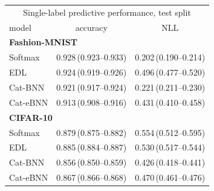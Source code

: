 \begin{tabular}{lcc}
\toprule
\multicolumn{3}{c}{Single-label predictive performance, test split} \\
model & accuracy & NLL \\
\midrule
\multicolumn{3}{l}{\textbf{Fashion-MNIST}} \\
\midrule
Softmax & 0.928\,(0.923--0.933) & 0.202\,(0.190--0.214) \\
EDL & 0.924\,(0.919--0.926) & 0.496\,(0.477--0.520) \\
Cat-BNN & 0.921\,(0.917--0.924) & 0.221\,(0.211--0.230) \\
Cat-eBNN & 0.913\,(0.908--0.916) & 0.431\,(0.410--0.458) \\
\midrule
\multicolumn{3}{l}{\textbf{CIFAR-10}} \\
\midrule
Softmax & 0.879\,(0.875--0.882) & 0.554\,(0.512--0.595) \\
EDL & 0.885\,(0.884--0.887) & 0.530\,(0.517--0.544) \\
Cat-BNN & 0.856\,(0.850--0.859) & 0.426\,(0.418--0.441) \\
Cat-eBNN & 0.867\,(0.866--0.868) & 0.470\,(0.461--0.476) \\
\bottomrule
\end{tabular}
